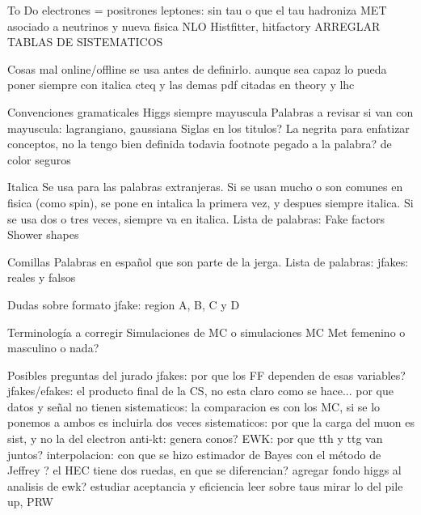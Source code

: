 

{To Do}
electrones = positrones %
leptones: sin tau o que el tau hadroniza %
MET asociado a neutrinos y nueva fisica %
NLO %
Histfitter, hitfactory %
ARREGLAR TABLAS DE SISTEMATICOS %

{Cosas mal}
online/offline se usa antes de definirlo. aunque sea capaz lo pueda poner siempre con italica
cteq y las demas pdf citadas en theory y lhc

{Convenciones gramaticales}
Higgs siempre mayuscula
Palabras a revisar si van con mayuscula: lagrangiano, gaussiana
Siglas en los titulos?
La negrita para enfatizar conceptos, no la tengo bien definida todavia
footnote pegado a la palabra? de color seguros

{Italica}
Se usa para las palabras extranjeras. Si se usan mucho o son comunes en fisica (como spin), se pone en intalica la primera vez, y despues siempre italica. Si se usa dos o tres veces, siempre va en italica.
Lista de palabras:
Fake factors
Shower shapes

{Comillas}
Palabras en español que son parte de la jerga.
Lista de palabras:
jfakes: reales y falsos

{Dudas sobre formato}
jfake: region A, B, C y D


{Terminología a corregir}
Simulaciones de MC o simulaciones MC
Met femenino o masculino o nada?

{Posibles preguntas del jurado}
jfakes: por que los FF dependen de esas variables?
jfakes/efakes: el producto final de la CS, no esta claro como se hace...
por que datos y señal no tienen sistematicos: la comparacion es con los MC, si se lo ponemos a ambos es incluirla dos veces
sistematicos: por que la carga del muon es sist, y no la del electron
anti-kt: genera conos?
EWK: por que tth y ttg van juntos?
interpolacion: con que se hizo
estimador de Bayes con el método de Jeffrey ?
el HEC tiene dos ruedas, en que se diferencian?
agregar fondo higgs al analisis de ewk?
estudiar aceptancia y eficiencia
leer sobre taus
mirar lo del pile up, PRW






